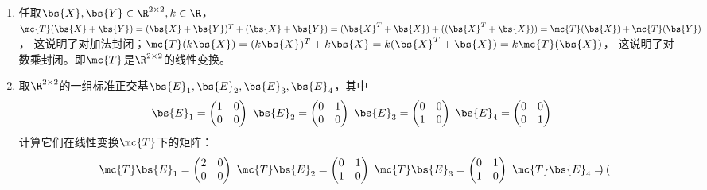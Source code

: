 \documentclass[12pt, a4paper, oneside, UTF8]{ctexbook}
\begin{document}
\begin{solution}
    \begin{enumerate}[label=(\arabic{*})]
        \item 任取$\bs{X},\bs{Y} \in \R^{2\times 2},k \in \R$，
        $\mc{T}(\bs{X}+\bs{Y})=(\bs{X}+\bs{Y})^T+(\bs{X}+\bs{Y})=
        (\bs{X}^T+\bs{X})+((\bs{X}^T+\bs{X}))=\mc{T}(\bs{X})+\mc{T}(\bs{Y})$，
        这说明了对加法封闭；$\mc{T}(k\bs{X})=(k\bs{X})^T+k\bs{X}=k(\bs{X}^T+\bs{X})=k\mc{T}(\bs{X})$，
        这说明了对数乘封闭。即$\mc{T}$是$\R^{2\times 2}$的线性变换。
        \item 取$\R^{2\times 2}$的一组标准正交基$\bs{E}_1,\bs{E}_2,\bs{E}_3,\bs{E}_4$，其中
        \begin{align*}
            \bs{E}_1=\begin{pmatrix}
                1&0\\
                0&0
            \end{pmatrix} \ 
            \bs{E}_2=\begin{pmatrix}
                0&1\\
                0&0
            \end{pmatrix} \ 
            \bs{E}_3=\begin{pmatrix}
                0&0\\
                1&0
            \end{pmatrix} \ 
            \bs{E}_4=\begin{pmatrix}
                0&0\\
                0&1
            \end{pmatrix}
        \end{align*}
        计算它们在线性变换$\mc{T}$下的矩阵：
        \begin{align*}
            \mc{T}\bs{E}_1=\begin{pmatrix}
                2&0\\
                0&0
            \end{pmatrix} \ 
            \mc{T}\bs{E}_2=\begin{pmatrix}
                0&1\\
                1&0
            \end{pmatrix} \ 
            \mc{T}\bs{E}_3=\begin{pmatrix}
                0&1\\
                1&0
            \end{pmatrix} \ 
            \mc{T}\bs{E}_4=\begin{pmatrix}

\end{pmatrix}
\end{align*}
\end{enumerate}
\end{solution}
\end{document}

